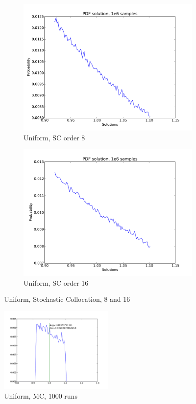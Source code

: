 \documentclass[11pt]{article} %
\begin{document}
\begin{figure}[h!]
\centering
  \begin{subfigure}[b]{0.45 \textwidth}
   \includegraphics[width=\textwidth]{1d_sc_8_u}
   \caption{Uniform, SC order 8}
   \label{sc8}
  \end{subfigure}
  \begin{subfigure}[b]{0.45\textwidth}
   \includegraphics[width=\textwidth]{1d_sc_16_u}
   \caption{Uniform, SC order 16}
   \label{sc16}
  \end{subfigure}
\caption{Uniform, Stochastic Collocation, 8 and 16}
\end{figure}
\begin{figure}[h!]
\centering
   \includegraphics[width=0.5\textwidth]{1d_mc_siga_uniform_1000}
   \caption{Uniform, MC, 1000 runs }
   \label{mc}
\end{figure}
\end{document}
